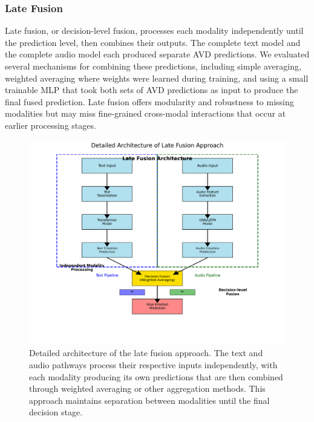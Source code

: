 \documentclass[12pt]{article}
\begin{document}
\subsubsection{Late Fusion}
Late fusion, or decision-level fusion, processes each modality independently until the prediction level, then combines their outputs. The complete text model and the complete audio model each produced separate AVD predictions. We evaluated several mechanisms for combining these predictions, including simple averaging, weighted averaging where weights were learned during training, and using a small trainable MLP that took both sets of AVD predictions as input to produce the final fused prediction. Late fusion offers modularity and robustness to missing modalities but may miss fine-grained cross-modal interactions that occur at earlier processing stages.

\begin{figure}[h]
    \centering
    \includegraphics[width=0.9\linewidth]{Figures_Improved/late_fusion_detailed_proper_improved.png}
    \caption{Detailed architecture of the late fusion approach. The text and audio pathways process their respective inputs independently, with each modality producing its own predictions that are then combined through weighted averaging or other aggregation methods. This approach maintains separation between modalities until the final decision stage.}
    \label{fig:late_fusion}
\end{figure}
\end{document}
